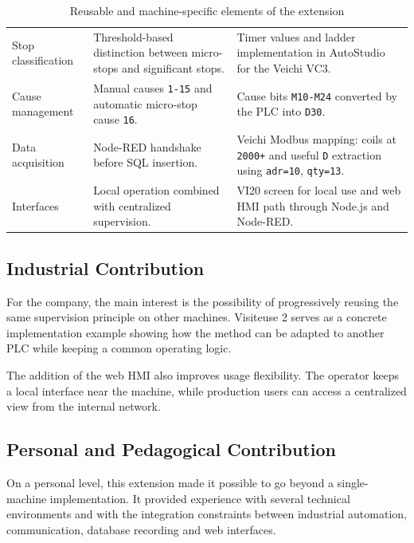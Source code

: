 \begin{table}[H]
\centering
\caption{Reusable and machine-specific elements of the extension}
\begin{tabularx}{\textwidth}{|P{0.28\textwidth}|Y|Y|}
\hline
{}
 &  &  \\
\hline
Stop classification & Threshold-based distinction between micro-stops and significant stops. & Timer values and ladder implementation in AutoStudio for the Veichi VC3. \\
\hline
Cause management & Manual causes \texttt{1-15} and automatic micro-stop cause \texttt{16}. & Cause bits \texttt{M10-M24} converted by the PLC into \texttt{D30}. \\
\hline
Data acquisition & Node-RED handshake before SQL insertion. & Veichi Modbus mapping: coils at \texttt{2000+} and useful \texttt{D} extraction using \texttt{adr=10}, \texttt{qty=13}. \\
\hline
Interfaces & Local operation combined with centralized supervision. & VI20 screen for local use and web HMI path through Node.js and Node-RED. \\
\hline
\end{tabularx}
\end{table}

\subsection{Industrial Contribution}
For the company, the main interest is the possibility of progressively reusing the same supervision principle on other machines. Visiteuse 2 serves as a concrete implementation example showing how the method can be adapted to another PLC while keeping a common operating logic.

The addition of the web HMI also improves usage flexibility. The operator keeps a local interface near the machine, while production users can access a centralized view from the internal network.

\subsection{Personal and Pedagogical Contribution}
On a personal level, this extension made it possible to go beyond a single-machine implementation. It provided experience with several technical environments and with the integration constraints between industrial automation, communication, database recording and web interfaces.

